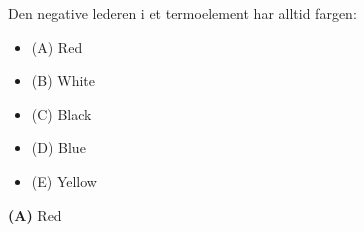 

Den negative lederen i et termoelement har alltid fargen:

\begin{itemize}
\item{(A)} Red
\vskip 5pt 
\item{(B)} White
\vskip 5pt 
\item{(C)} Black
\vskip 5pt 
\item{(D)} Blue
\vskip 5pt 
\item{(E)} Yellow
\end{itemize}







{\bf (A)} Red
 









